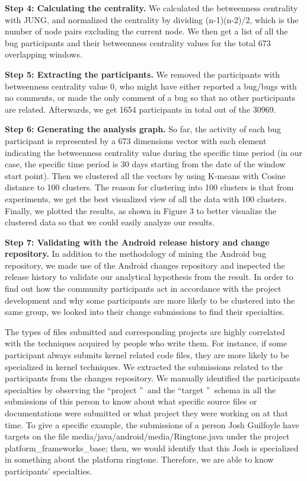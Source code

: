 \documentclass[10pt, conference, compsocconf]{IEEEtran}
\begin{document}
\textbf{Step 4: Calculating the centrality.} We calculated the betweenness centrality with JUNG, and normalized the centrality by dividing (n-1)(n-2)/2, which is the number of node pairs excluding the current node. We then get a list of all the bug participants and their betweenness centrality values for the total 673 overlapping windows.

\textbf{Step 5: Extracting the participants.} We removed the participants with betweenness centrality value 0, who might have either reported a bug/bugs with no comments, or made the only comment of a bug so that no other participants are related. Afterwards, we get 1654 participants in total out of the 30969.

\textbf{Step 6: Generating the analysis graph.} So far, the activity of each bug participant is represented by a 673 dimensions vector with each element indicating the betweenness centrality value during the specific time period (in our case, the specific time period is 30 days starting from the date of the window start point). Then we clustered all the vectors by using K-means with Cosine distance to 100 clusters. The reason for clustering into 100 clusters is that from experiments, we get the best visualized view of all the data with 100 clusters. Finally, we plotted the results, as shown in Figure 3 to better visualize the clustered data so that we could easily analyze our results.

\textbf{Step 7: Validating with the Android release history and change repository.} In addition to the methodology of mining the Android bug repository, we made use of the Android changes repository and inspected the release history to validate our analytical hypothesis from the result. In order to find out how the community participants act in accordance with the project development and why some participants are more likely to be clustered into the same group, we looked into their change submissions to find their specialties.

The types of files submitted and corresponding projects are highly correlated with the techniques acquired by people who write them. For instance, if some participant always submits kernel related code files, they are more likely to be specialized in kernel techniques. We extracted the submissions related to the participants from the changes repository. We manually identified the participants specialties by observing the \textquotedblleft project \textquotedblright \ and the \textquotedblleft target \textquotedblright \ schema in all the submissions of this person to know about what specific source files or documentations were submitted or what project they were working on at that time. To give a specific example, the submissions of a person Josh Guilfoyle have targets on the file media/java/android/media/Ringtone.java under the project platform\_frameworks\_base; then, we would identify that this Josh is specialized in something about the platform ringtone. 
Therefore, we are able to know participants' specialties. 
\end{document}
